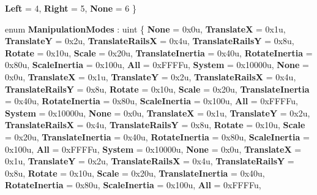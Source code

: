 \begin{DoxyCompactItemize}
\newline
{\bfseries Left} = 4, 
{\bfseries Right} = 5, 
{\bfseries None} = 6
 \}
\item 
\mbox{\label{namespace_windows_1_1_u_i_1_1_xaml_1_1_input_a8c481e845e38fcfb6aa19028f4362554}} 
enum {\bfseries Manipulation\+Modes} \+: uint \{ \newline
{\bfseries None} = 0x0u, 
{\bfseries TranslateX} = 0x1u, 
{\bfseries TranslateY} = 0x2u, 
{\bfseries Translate\+RailsX} = 0x4u, 
\newline
{\bfseries Translate\+RailsY} = 0x8u, 
{\bfseries Rotate} = 0x10u, 
{\bfseries Scale} = 0x20u, 
{\bfseries Translate\+Inertia} = 0x40u, 
\newline
{\bfseries Rotate\+Inertia} = 0x80u, 
{\bfseries Scale\+Inertia} = 0x100u, 
{\bfseries All} = 0x\+F\+F\+F\+Fu, 
{\bfseries System} = 0x10000u, 
\newline
{\bfseries None} = 0x0u, 
{\bfseries TranslateX} = 0x1u, 
{\bfseries TranslateY} = 0x2u, 
{\bfseries Translate\+RailsX} = 0x4u, 
\newline
{\bfseries Translate\+RailsY} = 0x8u, 
{\bfseries Rotate} = 0x10u, 
{\bfseries Scale} = 0x20u, 
{\bfseries Translate\+Inertia} = 0x40u, 
\newline
{\bfseries Rotate\+Inertia} = 0x80u, 
{\bfseries Scale\+Inertia} = 0x100u, 
{\bfseries All} = 0x\+F\+F\+F\+Fu, 
{\bfseries System} = 0x10000u, 
\newline
{\bfseries None} = 0x0u, 
{\bfseries TranslateX} = 0x1u, 
{\bfseries TranslateY} = 0x2u, 
{\bfseries Translate\+RailsX} = 0x4u, 
\newline
{\bfseries Translate\+RailsY} = 0x8u, 
{\bfseries Rotate} = 0x10u, 
{\bfseries Scale} = 0x20u, 
{\bfseries Translate\+Inertia} = 0x40u, 
\newline
{\bfseries Rotate\+Inertia} = 0x80u, 
{\bfseries Scale\+Inertia} = 0x100u, 
{\bfseries All} = 0x\+F\+F\+F\+Fu, 
{\bfseries System} = 0x10000u, 
\newline
{\bfseries None} = 0x0u, 
{\bfseries TranslateX} = 0x1u, 
{\bfseries TranslateY} = 0x2u, 
{\bfseries Translate\+RailsX} = 0x4u, 
\newline
{\bfseries Translate\+RailsY} = 0x8u, 
{\bfseries Rotate} = 0x10u, 
{\bfseries Scale} = 0x20u, 
{\bfseries Translate\+Inertia} = 0x40u, 
\newline
{\bfseries Rotate\+Inertia} = 0x80u, 
{\bfseries Scale\+Inertia} = 0x100u, 
{\bfseries All} = 0x\+F\+F\+F\+Fu, 

\end{DoxyCompactItemize}
